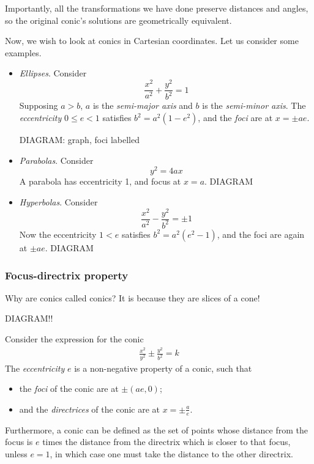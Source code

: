 \documentclass{../template/note}
\begin{document}
    Importantly, all the transformations we have done preserve distances and angles, so the original conic's solutions are geometrically equivalent.

    Now, we wish to look at conics in Cartesian coordinates. Let us consider some examples.

    \begin{itemize}
        \item \emph{Ellipses}. Consider
        \[
            \frac{x^2}{a^2} + \frac{y^2}{b^2} = 1
        \]
        Supposing \(a > b\), \(a\) is the \emph{semi-major axis} and \(b\) is the \emph{semi-minor axis}. The \emph{eccentricity} \(0 \leq e < 1\) satisfies \(b^2 = a^2(1-e^2)\), and the \emph{foci} are at \(x = \pm ae\). 

        DIAGRAM: graph, foci labelled
        \item \emph{Parabolas}. Consider
        \[
            y^2 = 4ax
        \]
        A parabola has eccentricity 1, and focus at \(x=a\).
        DIAGRAM
        \item \emph{Hyperbolas}. Consider
        \[
            \frac{x^2}{a^2} - \frac{y^2}{b^2} = \pm 1
        \]
        Now the eccentricity \(1 < e\) satisfies \(b^2 = a^2(e^2-1)\), and the foci are again at \(\pm ae\).
        DIAGRAM
    \end{itemize}
    

    \subsubsection{Focus-directrix property}

    Why are conics called conics? It is because they are slices of a cone!

    DIAGRAM!!

    
    \begin{definition}
        Consider the expression for the conic
        \begin{align*}
            \frac{x^2}{y^2} \pm \frac{y^2}{b^2} = k
        \end{align*}
        The \emph{eccentricity} \(e\) is a non-negative property of a conic, such that
        \begin{itemize}
            \item the \emph{foci} of the conic are at \(\pm (ae, 0)\);
            \item and the \emph{directrices} of the conic are at \(x = \pm \frac a e\).
        \end{itemize}
        Furthermore, a conic can be defined as the set of points whose distance from the focus is \(e\) times the distance from the directrix which is closer to that focus, unless \(e=1\), in which case one must take the distance to the other directrix.        
    \end{definition}
    
\end{document}
